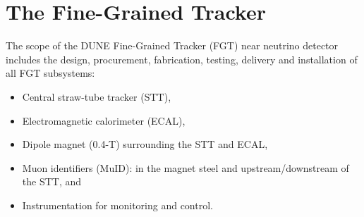 \section{The Fine-Grained Tracker} 
\label{cdrsec:detectors-nd-ref}

The scope of the DUNE Fine-Grained Tracker (FGT) near neutrino
detector includes the design, procurement, fabrication, testing,
delivery and installation of all FGT subsystems:
\begin{itemize}
\item Central straw-tube tracker (STT),
\item Electromagnetic calorimeter (ECAL),
\item Dipole magnet (0.4-T) surrounding the STT and ECAL,
\item Muon identifiers (MuID): in the magnet steel and upstream/downstream of the STT, and 
\item Instrumentation for monitoring and control.
\end{itemize}



